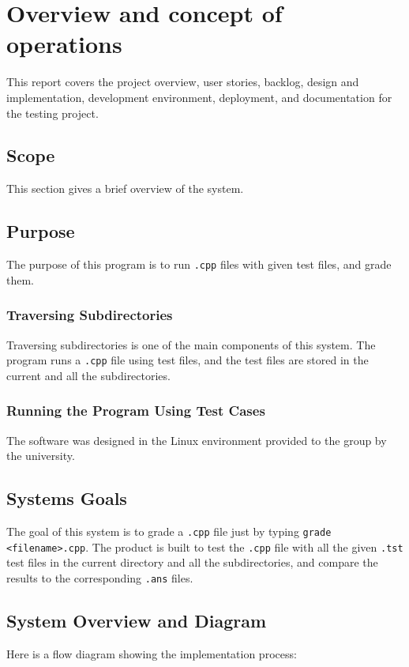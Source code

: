 
\chapter{Overview and concept of operations}

This report covers the project overview, user stories, backlog, design and implementation, development environment, deployment, and documentation for the testing project. 


\section{Scope}
This section gives a brief overview of the system.


\section{Purpose}
The purpose of this program is to run {\tt .cpp} files with given test files, and grade them. 


\subsection{Traversing Subdirectories}
Traversing subdirectories is one of the main components of this system. The program runs a {\tt .cpp} file using test files, and the test files are stored in the current and all the subdirectories.  

\subsection{Running the Program Using Test Cases}
The software was designed in the Linux environment provided to the group by the university. 
 

\section{Systems Goals}
The goal of this system is to grade a {\tt .cpp} file just by typing {\tt grade <filename>.cpp}. The product is built to test the {\tt .cpp} file with all the given {\tt .tst} test files in the current directory and all the subdirectories, and compare the results to the corresponding {\tt .ans} files.  

\section{System Overview and Diagram}
Here is a flow diagram showing the implementation process:


